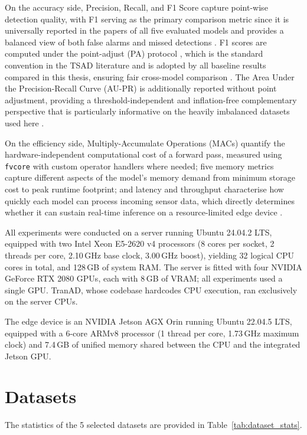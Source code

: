 \documentclass[twoside,11pt,openright]{report}
\begin{document}
On the accuracy side, Precision, Recall, and F1 Score 
capture point-wise detection quality, with F1 serving as the primary comparison metric 
since it is universally reported in the papers of all five evaluated models and provides 
a balanced view of both false alarms and missed detections \citep{darban2024survey}. 
F1 scores are computed under the point-adjust (PA) protocol \citep{xu2018donut}, which 
is the standard convention in the TSAD literature and is adopted by all baseline results 
compared in this thesis, ensuring fair cross-model comparison 
\citep{xu2022detectionadjustment}. The Area Under the Precision-Recall Curve (AU-PR) 
is additionally reported without point adjustment, providing a threshold-independent and 
inflation-free complementary perspective that is particularly informative on the heavily 
imbalanced datasets used here \citep{darban2024survey}. 

On the efficiency side, 
Multiply-Accumulate Operations (MACs) quantify the hardware-independent computational 
cost of a forward pass, measured using \texttt{fvcore} \citep{fvcore} with custom 
operator handlers where needed; five memory metrics capture different aspects of the 
model's memory demand from minimum storage cost to peak runtime footprint; and latency 
and throughput characterise how quickly each model can process incoming sensor data, 
which directly determines whether it can sustain real-time inference on a resource-limited 
edge device \citep{wang2025optimizing}.

All experiments were conducted on a server running Ubuntu 24.04.2 LTS, 
equipped with two Intel Xeon E5-2620 v4 
processors (8 cores per socket, 2 threads per core, 2.10\,GHz base clock, 
3.00\,GHz boost), yielding 32 logical CPU cores in total, and 128\,GB of system 
RAM. The server is fitted with four NVIDIA GeForce RTX 2080 GPUs, each with 
8\,GB of VRAM; all experiments used a single GPU. TranAD, whose codebase hardcodes CPU execution, 
ran exclusively on the server CPUs.

The edge device is an NVIDIA Jetson AGX Orin running Ubuntu 22.04.5 LTS, 
equipped with a 6-core ARMv8 processor (1 thread per core, 1.73\,GHz maximum clock) 
and 7.4\,GB of unified memory shared between the CPU and the integrated Jetson GPU.

\section{Datasets}

The statistics of the 5 selected datasets are provided in Table~\ref{tab:dataset_stats}.
\end{document}
